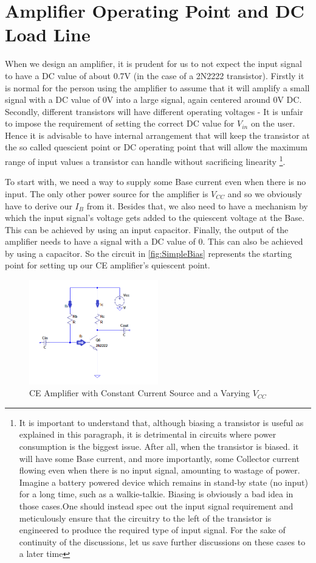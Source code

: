 \section{Amplifier Operating Point and DC Load Line}
When we design an amplifier, it is prudent for us to not expect the input signal to have a DC value of about 0.7V (in the case of a 2N2222 transistor). Firstly it is normal for the person using the amplifier to assume that it will amplify a small signal with a DC value of 0V into a large signal, again centered around 0V DC. Secondly, different transistors will have different operating voltages - It is unfair to impose the requirement of setting the correct DC value for $V_{in}$ on the user. Hence it is advisable to have internal arrangement that will keep the transistor at the so called quescient point or DC operating point that will allow the maximum range of input values a transistor can handle without sacrificing linearity \footnote{It is important to understand that, although biasing a transistor is useful as explained in this paragraph, it is detrimental in circuits where power consumption is the biggest issue. After all, when the transistor is biased. it will have some Base current, and more importantly, some Collector current flowing even when there is no input signal, amounting to wastage of power. Imagine a battery powered device which remains in stand-by state (no input) for a long time, such as a walkie-talkie. Biasing is obviously a bad idea in those cases.One should instead spec out the input signal requirement and meticulously ensure that the circuitry to the left of the transistor is engineered to produce the required type of input signal. For the sake of continuity of the discussions, let us save further discussions on these cases to a later time}.

To start with, we need a way to supply some Base current even when there is no input. The only other power source for the amplifier is $V_{CC}$ and so we obviously have to derive our $I_B$ from it. Besides that, we also need to have a mechanism by which the input signal's voltage gets added to the quiescent voltage at the Base. This can be achieved by using an input capacitor. Finally, the output of the amplifier needs to have a signal with a DC value of 0. This can also be achieved by using a capacitor. So the circuit in \autoref{fig:SimpleBias} represents the starting point for setting up our CE amplifier's quiescent point. 

	\begin{figure}[h!]
	\centering
	\includegraphics[width = 0.5\textwidth]{partHW/SimpleBias}
	\caption{CE Amplifier with Constant Current Source and a Varying $V_{CC}$}
	\label{fig:SimpleBias}
	\end{figure}

